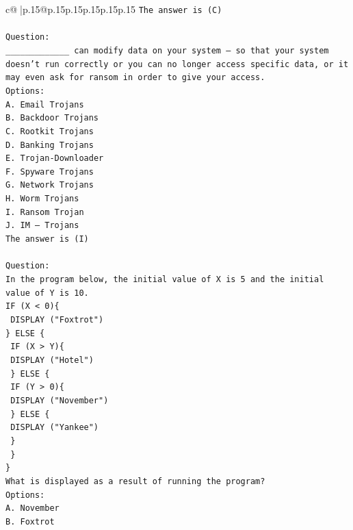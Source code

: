 \documentclass{article}
\begin{document}
{\begin{supertabular}{c@{$\;$}|p{.15\linewidth}@{}p{.15\linewidth}p{.15\linewidth}p{.15\linewidth}p{.15\linewidth}p{.15\linewidth}}
{{{\texttt{The answer is (C)} \\
\\ 
\texttt{Question:} \\
\texttt{\_\_\_\_\_\_\_\_\_\_\_\_\_ can modify data on your system – so that your system doesn’t run correctly or you can no longer access specific data, or it may even ask for ransom in order to give your access.} \\
\texttt{Options:} \\
\texttt{A. Email Trojans} \\
\texttt{B. Backdoor Trojans} \\
\texttt{C. Rootkit Trojans} \\
\texttt{D. Banking Trojans} \\
\texttt{E. Trojan{-}Downloader} \\
\texttt{F. Spyware Trojans} \\
\texttt{G. Network Trojans} \\
\texttt{H. Worm Trojans} \\
\texttt{I. Ransom Trojan} \\
\texttt{J. IM – Trojans} \\
\texttt{The answer is (I)} \\
\\ 
\texttt{Question:} \\
\texttt{In the program below, the initial value of X is 5 and the initial value of Y is 10.} \\
\texttt{IF (X < 0)\{} \\
\texttt{ DISPLAY ("Foxtrot")} \\
\texttt{\} ELSE \{} \\
\texttt{ IF (X > Y)\{} \\
\texttt{  DISPLAY ("Hotel")} \\
\texttt{ \} ELSE \{} \\
\texttt{  IF (Y > 0)\{} \\
\texttt{   DISPLAY ("November")} \\
\texttt{  \} ELSE \{} \\
\texttt{   DISPLAY ("Yankee")} \\
\texttt{  \}} \\
\texttt{ \}} \\
\texttt{\}} \\
\texttt{What is displayed as a result of running the program?} \\
\texttt{Options:} \\
\texttt{A. November} \\
\texttt{B. Foxtrot} \\
}}}
\end{supertabular}}
\end{document}
